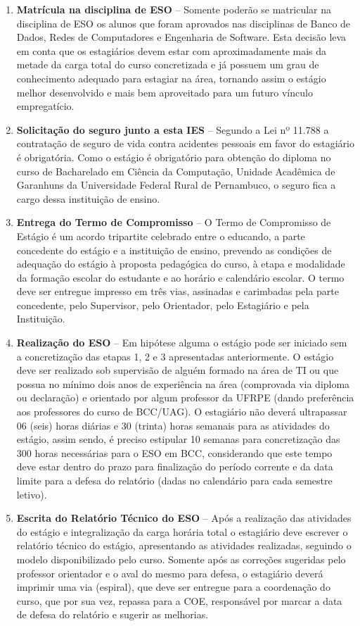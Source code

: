 \documentclass[
	12pt,				%
	openright,			%
  oneside,     %
	a4paper,			%
	english,			%
	french,				%
	spanish,			%
	brazil				%
	]{abntex2}
\begin{document}
\begin{enumerate}
    \item \textbf{Matrícula na disciplina de ESO} – Somente poderão se matricular na disciplina de ESO os alunos que foram aprovados nas disciplinas de Banco de Dados, Redes de Computadores e Engenharia de Software. Esta decisão leva em conta que os estagiários devem estar com aproximadamente mais da metade da carga total do curso concretizada e já possuem um grau de conhecimento adequado para estagiar na área, tornando assim o estágio melhor desenvolvido e mais bem aproveitado para um futuro vínculo empregatício.
    \item \textbf{Solicitação do seguro junto a esta IES} – Segundo a Lei nº 11.788 a contratação de seguro de vida contra acidentes pessoais em favor do estagiário é obrigatória. Como o estágio é obrigatório para obtenção do diploma no curso de Bacharelado em Ciência da Computação, Unidade Acadêmica de Garanhuns da Universidade Federal Rural de Pernambuco, o seguro fica a cargo dessa instituição de ensino.
    \item \textbf{Entrega do Termo de Compromisso} – O Termo de Compromisso de Estágio é um acordo tripartite celebrado entre o educando, a parte concedente do estágio e a instituição de ensino, prevendo as condições de adequação do estágio à proposta pedagógica do  curso, à etapa e modalidade da formação escolar  do  estudante  e ao horário e calendário escolar. O termo deve ser entregue impresso em três vias, assinadas e carimbadas pela parte concedente, pelo  Supervisor,  pelo  Orientador, pelo Estagiário e pela Instituição.
    \item \textbf{Realização do ESO} – Em hipótese alguma o estágio pode ser iniciado sem a concretização das etapas 1, 2 e 3 apresentadas anteriormente. O estágio deve ser realizado sob supervisão de alguém formado na área de TI ou que possua no mínimo dois anos de experiência na área (comprovada via diploma ou declaração) e orientado por algum professor da UFRPE (dando preferência aos professores do curso de BCC/UAG). O estagiário não deverá ultrapassar 06 (seis) horas diárias e 30 (trinta) horas semanais para as atividades do estágio, assim sendo, é preciso estipular 10 semanas para concretização das 300 horas necessárias para o ESO em BCC, considerando que este tempo deve estar dentro do prazo para finalização do período corrente e da data limite para a defesa do relatório (dadas no calendário para cada semestre letivo).
    \item \textbf{Escrita do Relatório Técnico do ESO} – Após a realização das atividades do estágio e integralização da carga horária total o estagiário deve escrever o relatório técnico do estágio, apresentando as atividades realizadas, seguindo o modelo disponibilizado pelo curso. Somente após as correções sugeridas pelo professor orientador e o aval do mesmo para defesa, o estagiário deverá imprimir uma via (espiral), que deve ser entregue para a coordenação do curso, que por sua vez, repassa para a COE, responsável por marcar a data de defesa do relatório e sugerir as melhorias.

\end{enumerate}
\end{document}
